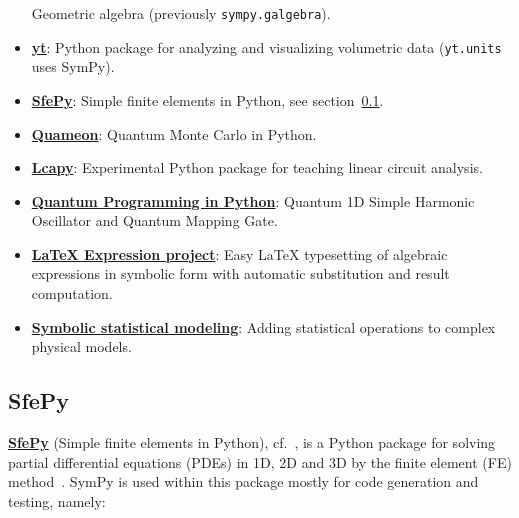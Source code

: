 \begin{itemize}
  Geometric algebra (previously \texttt{sympy.galgebra}).
\item
  \href{http://yt-project.org/}{\textbf{yt}}: Python package for
  analyzing and visualizing volumetric data (\texttt{yt.units} uses SymPy).
\item
  \href{http://sfepy.org/}{\textbf{SfePy}}: Simple finite elements in
  Python, see section~\ref{sfepy}.
\item
  \href{http://quameon.sourceforge.net/}{\textbf{Quameon}}: Quantum
  Monte Carlo in Python.
\item
  \href{http://lcapy.elec.canterbury.ac.nz/}{\textbf{Lcapy}}:
  Experimental Python package for teaching linear circuit analysis.
\item
  \href{http://digitalcommons.calpoly.edu/cgi/viewcontent.cgi?article=1072\&context=physsp/}{\textbf{Quantum
  Programming in Python}}: Quantum 1D Simple Harmonic Oscillator and
  Quantum Mapping Gate.
\item
  \href{http://mech.fsv.cvut.cz/~stransky/software/latexexpr/doc/}{\textbf{LaTeX
  Expression project}}: Easy \LaTeX{} typesetting of algebraic expressions
  in symbolic form with automatic substitution and result computation.
\item
  \href{https://www.researchgate.net/publication/260585491_Symbolic_Statistics_with_SymPy/}{\textbf{Symbolic
  statistical modeling}}: Adding statistical operations to complex
  physical models.
\end{itemize}

\subsection{SfePy}\label{sfepy}

\href{http://sfepy.org/}{\textbf{SfePy}} (Simple finite elements in Python),
cf.~\cite{cimrman2014sfepy}, is a Python package for solving partial
differential equations (PDEs) in 1D, 2D and 3D by the finite element (FE)
method~\cite{Zienkiewicz2013FEM}. SymPy is used within this package mostly for
code generation and testing, namely:


